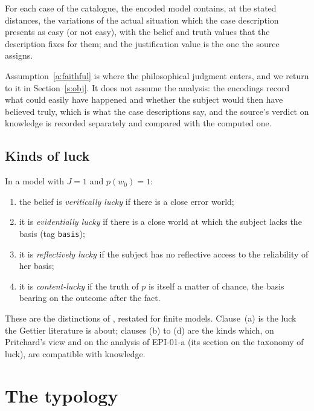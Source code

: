 \documentclass{situationist-preprint}
\begin{document}
\begin{assumption}\label{a:faithful}
For each case of the catalogue, the encoded model contains, at the stated distances, the variations of the actual situation which the case description presents as easy (or not easy), with the belief and truth values that the description fixes for them; and the justification value is the one the source assigns.
\end{assumption}

Assumption~\ref{a:faithful} is where the philosophical judgment enters, and we return to it in Section~\ref{s:obj}. It does not assume the analysis: the encodings record what could easily have happened and whether the subject would then have believed truly, which is what the case descriptions say, and the source's verdict on knowledge is recorded separately and compared with the computed one.

\subsection{Kinds of luck}

\begin{definition}[Luck]\label{d:luck}
In a model with $J = 1$ and $p(w_0) = 1$:
\begin{enumerate}[label=(\alph*)]
\item the belief is \emph{veritically lucky} if there is a close error world;
\item it is \emph{evidentially lucky} if there is a close world at which the subject lacks the basis (tag \texttt{basis});
\item it is \emph{reflectively lucky} if the subject has no reflective access to the reliability of her basis;
\item it is \emph{content-lucky} if the truth of $p$ is itself a matter of chance, the basis bearing on the outcome after the fact.
\end{enumerate}
\end{definition}

These are the distinctions of \citet{Pritchard2005}, restated for finite models. Clause~(a) is the luck the Gettier literature is about; clauses (b) to (d) are the kinds which, on Pritchard's view and on the analysis of EPI-01-a (its section on the taxonomy of luck), are compatible with knowledge.

\section{The typology}\label{s:typ}
\end{document}
